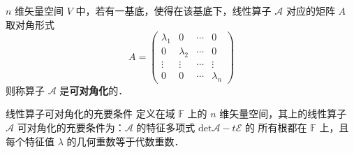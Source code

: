 \begin{definition}{}
 $n$ 维矢量空间 $V$ 中，若有一基底，使得在该基底下，线性算子 $\mathcal{A}$ 对应的矩阵 $A$ 取对角形式
 \begin{equation}
 A=\begin{pmatrix}
 \lambda_1&0&\cdots&0\\
 0&\lambda_2&\cdots&0\\
 \vdots&\vdots&\cdots&\vdots\\
 0&0&\cdots&\lambda_n
 \end{pmatrix}
 \end{equation}
 则称算子 $\mathcal{A}$ 是\textbf{可对角化}的．
\end{definition}
\begin{theorem}{线性算子可对角化的充要条件}
定义在域 $\mathbb{F}$ 上的 $n$ 维矢量空间，其上的线性算子 $\mathcal{A}$ 可对角化的充要条件为：$\mathcal{A}$ 的特征多项式 $\mathrm{det}{\mathcal{A}-t \mathcal{E}}$ 的 所有根都在 $\mathbb{F}$ 上，且每个特征值 $\lambda$ 的几何重数等于代数重数．


\end{theorem}